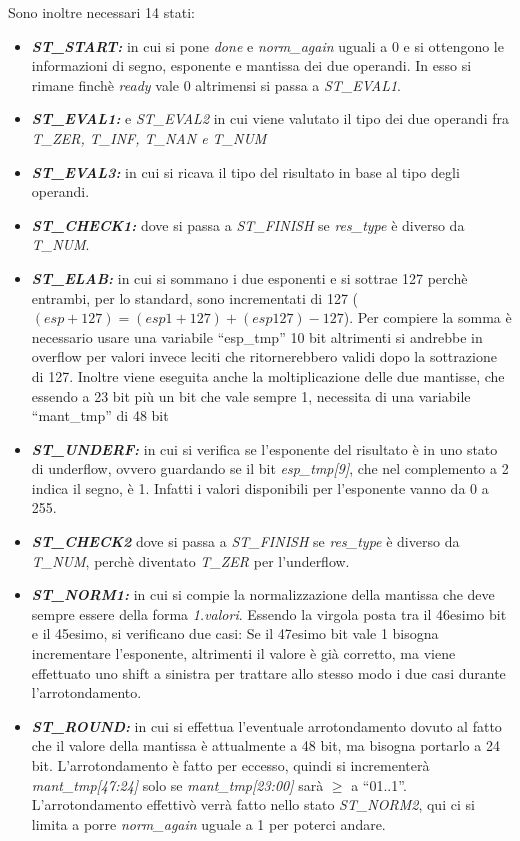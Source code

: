 \documentclass[]{IEEEtran}
\begin{document}
Sono inoltre necessari 14 stati:
\begin{itemize}
\item {\it\bf ST\_START:} in cui si pone {\it done} e {\it norm\_again} uguali a 0 e si ottengono le informazioni di segno, esponente e mantissa dei due operandi. In esso si rimane finchè {\it ready} vale 0 altrimensi si passa a {\it ST\_EVAL1}.
\item {\it\bf ST\_EVAL1:} e {\it ST\_EVAL2} in cui viene valutato il tipo dei due operandi fra {\it T\_ZER, T\_INF, T\_NAN e T\_NUM}
\item {\it\bf ST\_EVAL3:} in cui si ricava il tipo del risultato in base al tipo degli operandi.
\item {\it\bf ST\_CHECK1:} dove si passa a {\it ST\_FINISH} se {\it res\_type} è diverso da {\it T\_NUM}.
\item {\it\bf ST\_ELAB:} in cui si sommano i due esponenti e si sottrae 127 perchè entrambi, per lo standard, sono incrementati di 127 (\((esp+127) = (esp1+127)+(esp127) - 127\)). Per compiere la somma è necessario usare una variabile ``esp\_tmp'' 10 bit altrimenti si andrebbe in overflow per valori invece leciti che ritornerebbero validi dopo la sottrazione di 127. Inoltre viene eseguita anche la moltiplicazione delle due mantisse, che essendo a 23 bit più un bit che vale sempre 1, necessita di una variabile ``mant\_tmp'' di 48 bit 
\item {\it\bf ST\_UNDERF:} in cui si verifica se l'esponente del risultato è in uno stato di underflow, ovvero guardando se il bit {\it esp\_tmp[9]}, che nel complemento a 2 indica il segno, è 1. Infatti i valori disponibili per l'esponente vanno da 0 a 255.
\item {\it\bf ST\_CHECK2} dove si passa a {\it ST\_FINISH} se {\it res\_type} è diverso da {\it T\_NUM}, perchè diventato {\it T\_ZER} per l'underflow.
\item {\it\bf ST\_NORM1:} in cui si compie la normalizzazione della mantissa che deve sempre essere della forma {\it 1.valori}. Essendo la virgola posta tra il 46esimo bit e il 45esimo, si verificano due casi: Se il 47esimo bit vale 1 bisogna incrementare l'esponente, altrimenti il valore è già corretto, ma viene effettuato uno shift a sinistra per trattare allo stesso modo i due casi durante l'arrotondamento.
\item {\it\bf ST\_ROUND:} in cui si effettua l'eventuale arrotondamento dovuto al fatto che il valore della mantissa è attualmente a 48 bit, ma bisogna portarlo a 24 bit. L'arrotondamento è fatto per eccesso, quindi si incrementerà {\it mant\_tmp[47:24]} solo se {\it mant\_tmp[23:00]} sarà \( \geq \) a ``01..1''. L'arrotondamento effettivò verrà fatto nello stato {\it ST\_NORM2}, qui ci si limita a porre {\it norm\_again} uguale a 1 per poterci andare.

\end{itemize}
\end{document}
